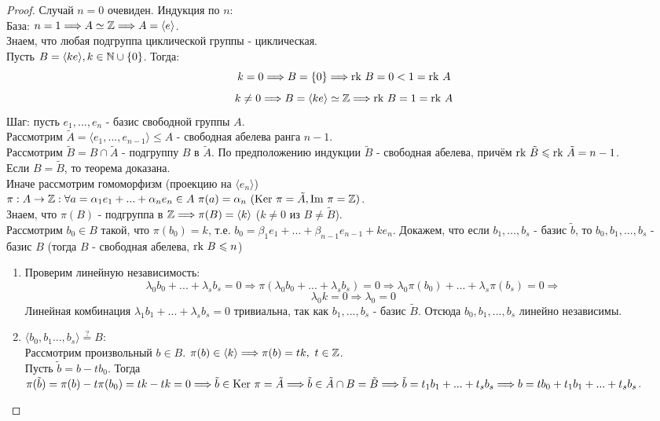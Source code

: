 \begin{proof}
    Случай $n = 0$ очевиден. Индукция по $n$:\\
    \tab База: $n = 1 \Longrightarrow A \simeq \mathbb{Z} \Longrightarrow A = \langle e \rangle$.\\
    Знаем, что любая подгруппа циклической группы - циклическая.\\
    Пусть $B = \langle ke \rangle, k \in \mathbb{N} \cup \{0\}$. Тогда:
    \[k = 0 \Longrightarrow B = \{0\} \Longrightarrow \textup{rk }B = 0 < 1 = \textup{rk }A\]
    \[k \neq 0 \Longrightarrow B = \langle ke \rangle \simeq \mathbb{Z} \Longrightarrow \textup{rk }B = 1 = \textup{rk }A\]
    \tab Шаг: пусть $e_1,...,e_n$ - базис свободной группы $A$.\\
    Рассмотрим $\tilde{A} = \langle e_1,...,e_{n-1} \rangle \leq A$ - свободная абелева ранга $n-1$.\\
    Рассмотрим $\tilde{B} = B \cap \tilde{A}$ - подгруппу $B$ в $\tilde{A}$. По предположению индукции $\tilde{B}$ - свободная абелева, причём $\textup{rk }\tilde{B} \leqslant \textup{rk }\tilde{A} = n-1$.\\
    Если $B = \tilde{B}$, то теорема доказана. \\
    Иначе рассмотрим гомоморфизм (проекцию на $\langle e_n \rangle$) \\ $\pi: A \rightarrow \mathbb{Z}: \forall a = \alpha_1e_1 + ... + \alpha_ne_n \in A \ \pi(a) = \alpha_n \ (\textup{Ker }\pi = \tilde{A}, \textup{Im }\pi = \mathbb{Z})$.\\
    Знаем, что $\pi(B)$ - подгруппа в $\mathbb{Z} \Longrightarrow \pi(B) = \langle k \rangle$ ($k \neq 0$ из $B \neq \tilde{B}$).\\
    Рассмотрим $b_0 \in B$ такой, что $\pi(b_0) = k$, т.е. $b_0 = \beta_1e_1 + ... + \beta_{n-1}e_{n-1} + ke_n$. Докажем, что если $b_1,...,b_s$ - базис $\tilde{b}$, то $b_0, b_1,...,b_s$ - базис $B$ (тогда $B$ - свободная абелева, $\textup{rk }B \leqslant n$)
    \begin{enumerate}
        \item Проверим линейную независимость:
        \[\lambda_0b_0 + ... + \lambda_sb_s = 0 \Rightarrow \pi(\lambda_0b_0 + ... + \lambda_sb_s) = 0 \Rightarrow \lambda_0\pi(b_0) + ... + \lambda_s\pi(b_s) = 0 \Longrightarrow\]
        \[\lambda_0k = 0 \Rightarrow \lambda_0 = 0\]
        Линейная комбинация $\lambda_1b_1 + ... + \lambda_sb_s = 0$ тривиальна, так как $b_1,...,b_s$ - базис $\tilde{B}$. Отсюда $b_0,b_1,...,b_s$ линейно независимы.
        \item $\langle b_0,b_1...,b_s \rangle \overset{?}{=} B$:\\
        Рассмотрим произвольный $b \in B$. $\pi(b) \in \langle k \rangle \Longrightarrow \pi(b) = tk, \ t \in \mathbb{Z}$.\\
        Пусть $\tilde{b} = b - tb_0$. Тогда $\pi(\tilde{b}) = \pi(b) - t\pi(b_0) = tk - tk = 0 \Longrightarrow \tilde{b} \in \textup{Ker }\pi = \tilde{A} \Longrightarrow \tilde{b} \in \tilde{A} \cap B = \tilde{B} \Longrightarrow \tilde{b} = t_1b_1 + ... + t_sb_s \Longrightarrow b = tb_0 + t_1b_1 + ... + t_sb_s$.
    \end{enumerate}
\end{proof}

